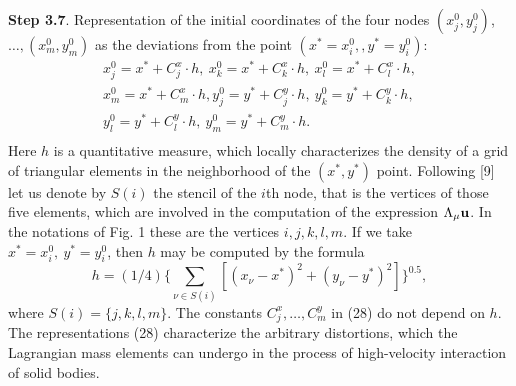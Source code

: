  {\bf Step 3.7}. Representation of the initial coordinates of the four nodes
$(x_j^0,y_j^0)$, $\ldots,(x_m^0,y_m^0)$ as the deviations from the point
$(x^*=x_i^0,,y^*=y_i^0)$:
\begin{eqnarray}
x_j^0=x^*+C_j^x\cdot h,~x_k^0=x^*+C_k^x\cdot h,~x_l^0=x^*+C_l^x\cdot h,
\nonumber\\
x_m^0=x^*+C_m^x\cdot h, y_j^0=y^*+C_j^y\cdot h,~y_k^0=y^* + C_k^y\cdot h,\\
y_l^0=y^*+C_l^y\cdot h,~y_m^0=y^* + C_m^y\cdot h.\nonumber\\
\nonumber
\end{eqnarray}
Here $h$ is a quantitative measure, which locally characterizes the density of
a grid of triangular elements in the neighborhood of the $(x^*,y^*)$
point. Following [9] let us denote by $S(i)$ the stencil of the $i$th node,
that is the vertices of those five elements, which are involved in the
computation of the expression $\Lambda_\mu {\bf u}$. In the notations of Fig. 1
these are the vertices $i,j,k,l,m$. If we take $x^*=x_i^0,~y^*=y_i^0$, then
$h$ may be computed by the formula
$$h=(1/4)\{\sum_{\nu\in S(i)}[(x_{\nu}-x^*)^2+(y_{\nu}-y^*)^2]\}^{0.5},$$
where $S(i)=\{j,k,l,m\}$. The constants $C_j^x,\ldots,C_m^y$ in (28) do not
depend on $h$. The representations (28) characterize the arbitrary distortions,
which the Lagrangian mass elements can undergo in the process of high-velocity
interaction of solid bodies.

